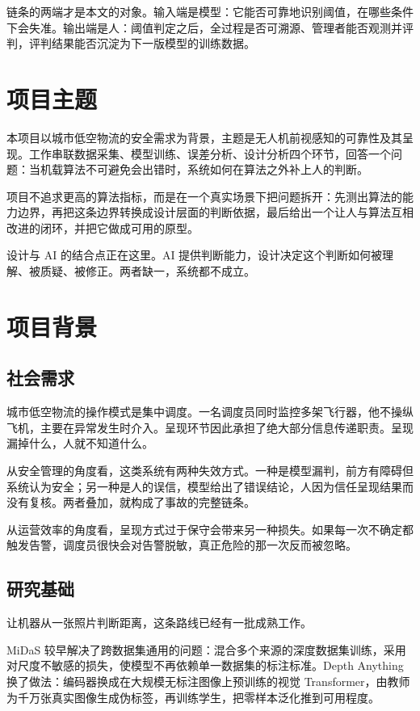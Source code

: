 \documentclass[12pt,a4paper]{ctexart}
\begin{document}
链条的两端才是本文的对象。输入端是模型：它能否可靠地识别阈值，在哪些条件下会失准。输出端是人：阈值判定之后，全过程是否可溯源、管理者能否观测并评判，评判结果能否沉淀为下一版模型的训练数据。

\section{项目主题}

本项目以城市低空物流的安全需求为背景，主题是无人机前视感知的可靠性及其呈现。工作串联数据采集、模型训练、误差分析、设计分析四个环节，回答一个问题：当机载算法不可避免会出错时，系统如何在算法之外补上人的判断。

项目不追求更高的算法指标，而是在一个真实场景下把问题拆开：先测出算法的能力边界，再把这条边界转换成设计层面的判断依据，最后给出一个让人与算法互相改进的闭环，并把它做成可用的原型。

设计与 AI 的结合点正在这里。AI 提供判断能力，设计决定这个判断如何被理解、被质疑、被修正。两者缺一，系统都不成立。

\section{项目背景}

\subsection{社会需求}

城市低空物流的操作模式是集中调度。一名调度员同时监控多架飞行器，他不操纵飞机，主要在异常发生时介入。呈现环节因此承担了绝大部分信息传递职责。呈现漏掉什么，人就不知道什么。

从安全管理的角度看，这类系统有两种失效方式。一种是模型漏判，前方有障碍但系统认为安全；另一种是人的误信，模型给出了错误结论，人因为信任呈现结果而没有复核。两者叠加，就构成了事故的完整链条。

从运营效率的角度看，呈现方式过于保守会带来另一种损失。如果每一次不确定都触发告警，调度员很快会对告警脱敏，真正危险的那一次反而被忽略。

\subsection{研究基础}

让机器从一张照片判断距离，这条路线已经有一批成熟工作。

MiDaS 较早解决了跨数据集通用的问题：混合多个来源的深度数据集训练，采用对尺度不敏感的损失，使模型不再依赖单一数据集的标注标准\cite{midas}。Depth Anything 换了做法：编码器换成在大规模无标注图像上预训练的视觉 Transformer，由教师为千万张真实图像生成伪标签，再训练学生，把零样本泛化推到可用程度\cite{da}。
\end{document}
